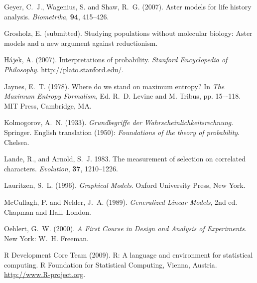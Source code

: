 \documentclass[11pt]{article}
\begin{document}
\begin{thebibliography}{}
Geyer, C.~J., Wagenius, S. and Shaw, R.~G. (2007).
\newblock Aster models for life history analysis.
\newblock \emph{Biometrika}, \textbf{94}, 415--426.

Grosholz, E. (submitted).
\newblock Studying populations without molecular biology: Aster models and
    a new argument against reductionism.

H\'{a}jek, A. (2007).
\newblock Interpretations of probability.
\newblock \emph{Stanford Encyclopedia of Philosophy}.
\newblock \url{http://plato.stanford.edu/}.

Jaynes, E.~T. (1978).
\newblock Where do we stand on maximum entropy?
\newblock In \emph{The Maximum Entropy Formalism}, Ed. R.~D. Levine and
    M. Tribus, pp. 15–-118.
\newblock MIT Press, Cambridge, MA.

Kolmogorov, A.~N. (1933).
\newblock \emph{Grundbegriffe der Wahrscheinlichkeitsrechnung}.
\newblock Springer.
\newblock English translation (1950): \emph{Foundations of the
    theory of probability}. Chelsea.

Lande, R., and Arnold, S.~J. 1983.
\newblock The measurement of selection on correlated characters.
\newblock \emph{Evolution}, \textbf{37}, 1210--1226.

Lauritzen, S.~L. (1996).
\newblock \emph{Graphical Models}.
\newblock Oxford University Press, New York.

McCullagh, P. and Nelder, J.~A. (1989).
\newblock \emph{Generalized Linear Models}, 2nd ed.
\newblock Chapman and Hall, London.


Oehlert, G.~W. (2000).
\newblock \emph{A First Course in Design and Analysis of Experiments}.
\newblock New York: W.~H. Freeman.

R Development Core Team (2009).
\newblock R: A language and environment for statistical computing.
\newblock R Foundation for Statistical Computing, Vienna, Austria.
\newblock \url{http://www.R-project.org}.


\end{thebibliography}
\end{document}
